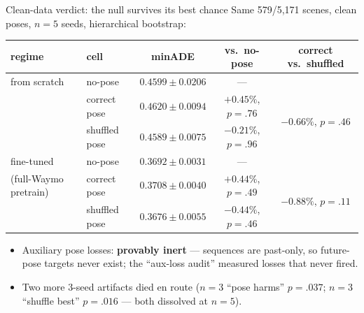 \documentclass[10pt,aspectratio=169]{beamer}
\begin{document}
\begin{frame}{Clean-data verdict: the null survives its best chance}
Same 579/5{,}171 scenes, clean poses, $n{=}5$ seeds, hierarchical bootstrap:
\begin{center}\small
\begin{tabular}{llccc}
\toprule
regime & cell & minADE & vs.\ no-pose & correct vs.\ shuffled \\
\midrule
from scratch & no-pose & $0.4599 \pm 0.0206$ & --- & \\
             & correct pose & $0.4620 \pm 0.0094$ & $+0.45\%$, $p{=}.76$ & \multirow{2}{*}{$-0.66\%$, $p{=}.46$}\\
             & shuffled pose & $0.4589 \pm 0.0075$ & $-0.21\%$, $p{=}.96$ & \\
\midrule
fine-tuned  & no-pose & $0.3692 \pm 0.0031$ & --- & \\
(full-Waymo pretrain) & correct pose & $0.3708 \pm 0.0040$ & $+0.44\%$, $p{=}.49$ & \multirow{2}{*}{$-0.88\%$, $p{=}.11$}\\
             & shuffled pose & $0.3676 \pm 0.0055$ & $-0.44\%$, $p{=}.46$ & \\
\bottomrule
\end{tabular}
\end{center}
\begin{itemize}
  \item Auxiliary pose losses: \textbf{provably inert} --- sequences are past-only, so
        future-pose targets never exist; the ``aux-loss audit'' measured losses that never fired.
  \item Two more 3-seed artifacts died en route ($n{=}3$ ``pose harms'' $p{=}.037$;
        $n{=}3$ ``shuffle best'' $p{=}.016$ --- both dissolved at $n{=}5$).
\end{itemize}
\end{frame}
\end{document}
